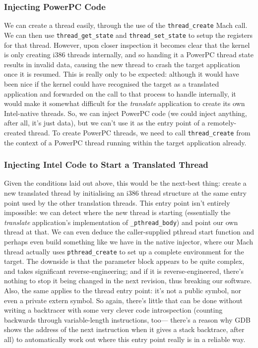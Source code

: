 \documentclass[english]{article}
\begin{document}
\subsubsection{Injecting PowerPC Code}
We can create a thread easily, through the use of the \texttt{thread\_create} Mach call. We can then use \texttt{thread\_get\_state} and \texttt{thread\_set\_state} to setup the registers for that thread. However, upon closer inspection it becomes clear that the kernel is only creating i386 threads internally, and so handing it a PowerPC thread state results in invalid data, causing the new thread to crash the target application once it is resumed. This is really only to be expected: although it would have been nice if the kernel could have recognised the target as a translated application and forwarded on the call to that process to handle internally, it would make it somewhat difficult for the \textsl{translate} application to create its own Intel-native threads. So, we can inject PowerPC code (we could inject anything, after all, it's just data), but we can't use it as the entry point of a remotely-created thread. To create PowerPC threads, we need to call \texttt{thread\_create} from the context of a PowerPC thread running within the target application already.

\subsubsection{Injecting Intel Code to Start a Translated Thread}
Given the conditions laid out above, this would be the next-best thing: create a new translated thread by initialising an i386 thread structure at the same entry point used by the other translation threads. This entry point isn't entirely impossible: we can detect where the new thread is starting (essentially the \textsl{translate} application's implementation of \texttt{\_pthread\_body}) and point our own thread at that. We can even deduce the caller-supplied pthread start function and perhaps even build something like we have in the native injector, where our Mach thread actually uses \texttt{pthread\_create} to set up a complete environment for the target. The downside is that the parameter block appears to be quite complex, and takes significant reverse-engineering; and if it is reverse-engineered, there's nothing to stop it being changed in the next revision, thus breaking our software. Also, the same applies to the thread entry point: it's not a public symbol, nor even a private extern symbol. So again, there's little that can be done without writing a backtracer with some very clever code introspection (counting backwards through variable-length instructions, too--- there's a reason why GDB shows the address of the next instruction when it gives a stack backtrace, after all) to automatically work out where this entry point really is in a reliable way.
\end{document}
